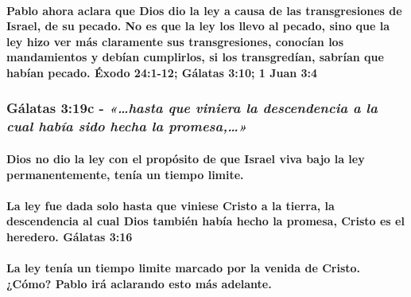 \documentclass[11a pt,twoside]{article}
\newcommand{\scripture}[1]{%
  {\fontsize{12pt}{16pt}\selectfont\ScriptureFont\itshape #1}%
}
\let\oldsubsubsection\subsubsection
\renewcommand{\subsubsection}{\needspace{4\baselineskip}\oldsubsubsection}
\let\oldparagraph\paragraph
\renewcommand{\paragraph}{\needspace{3\baselineskip}\oldparagraph}
\begin{document}
\paragraph{Pablo ahora aclara que Dios dio la ley a causa de las
transgresiones de Israel, de su pecado. No es que la ley los llevo al
pecado, sino que la ley hizo ver más claramente sus transgresiones,
conocían los mandamientos y debían cumplirlos, si los transgredían,
sabrían que habían pecado. Éxodo 24:1-12; Gálatas 3:10; 1 Juan
3:4}\label{pablo-ahora-aclara-que-dios-dio-la-ley-a-causa-de-las-transgresiones-de-israel-de-su-pecado.-no-es-que-la-ley-los-llevo-al-pecado-sino-que-la-ley-hizo-ver-muxe1s-claramente-sus-transgresiones-conocuxedan-los-mandamientos-y-debuxedan-cumplirlos-si-los-transgreduxedan-sabruxedan-que-habuxedan-pecado.-uxe9xodo-241-12-guxe1latas-310-1-juan-34}

\subsubsection{\texorpdfstring{Gálatas 3:19c -
\scripture{«…hasta que viniera la descendencia a la cual había sido hecha la promesa,…»}}{Gálatas 3:19c - }}\label{guxe1latas-319c---hasta-que-viniera-la-descendencia-a-la-cual-habuxeda-sido-hecha-la-promesa}

\paragraph{Dios no dio la ley con el propósito de que Israel viva bajo
la ley permanentemente, tenía un tiempo
limite.}\label{dios-no-dio-la-ley-con-el-propuxf3sito-de-que-israel-viva-bajo-la-ley-permanentemente-tenuxeda-un-tiempo-limite.}

\paragraph{La ley fue dada solo hasta que viniese Cristo a la tierra, la
descendencia al cual Dios también había hecho la promesa, Cristo es el
heredero. Gálatas
3:16}\label{la-ley-fue-dada-solo-hasta-que-viniese-cristo-a-la-tierra-la-descendencia-al-cual-dios-tambiuxe9n-habuxeda-hecho-la-promesa-cristo-es-el-heredero.-guxe1latas-316}

\paragraph{La ley tenía un tiempo limite marcado por la venida de
Cristo. ¿Cómo? Pablo irá aclarando esto más
adelante.}\label{la-ley-tenuxeda-un-tiempo-limite-marcado-por-la-venida-de-cristo.-cuxf3mo-pablo-iruxe1-aclarando-esto-muxe1s-adelante.}
\end{document}
